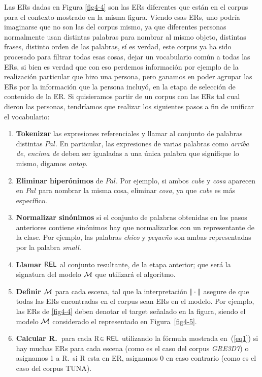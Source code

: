 Las ERs dadas en Figura \ref{fig4-4} son las ERs diferentes que est\'an en el corpus para el contexto mostrado en la misma figura. Viendo esas ERs, uno podr\'ia imaginarse que no son las del corpus mismo, ya que diferentes personas normalmente usan distintas palabras para nombrar al mismo objeto, distintas frases, distinto orden de las palabras, s\'i es verdad, este corpus ya ha sido procesado para filtrar todas esas cosas, dejar un vocabulario com\'un a todas las ERs, si bien es verdad que con eso perdemos informaci\'on por ejemplo de la realizaci\'on particular que hizo una persona, pero ganamos en poder agrupar las ERs por la informaci\'on que la persona incluy\'o, en la etapa de selecci\'on de contenido de la ER. Si quisieramos partir de un corpus con las ERs tal cual dieron las personas, tendr\'iamos que realizar los siguientes pasos a fin de unificar el vocabulario:

\begin{enumerate}
\item \textbf{Tokenizar} las expresiones referenciales y llamar al conjunto de palabras distintas
 $Pal$. En particular, las expresiones de varias palabras como {\it arriba de}, {\it encima de}
  deben ser igualadas a una \'unica palabra que signifique lo mismo, digamos \emph{ontop}.

\item \textbf{Eliminar hiper\'onimos} de $Pal$. Por ejemplo, si ambos \emph{cube} y
  \emph{cosa} aparecen en $Pal$ para nombrar la misma cosa, eliminar \emph{cosa}, ya que \emph{cube} es m\'as espec\'ifico.

\item \textbf{Normalizar sin\'onimos} si el conjunto de palabras obtenidas en los pasos anteriores contiene
  sin\'onimos hay que normalizarlos con un representante de la clase. Por ejemplo, las palabras \emph{chico}
  y \emph{peque\~no} son ambas representadas por la palabra \emph{small}.

\item \textbf{Llamar $\textsf{REL}$} al conjunto resultante, de la etapa anterior; que ser\'a la signatura del modelo $\mathcal{M}$ que utilizar\'a el algoritmo.

\item \textbf{Definir $\mathcal{M}$} para cada escena, tal que la interpretaci\'on
 $|\!|\cdot|\!|$ asegure de que todas las ERs encontradas en el corpus sean ERs en
  el modelo. Por ejemplo, las ERs de \ref{fig4-4} deben denotar el target se\~nalado en la figura, siendo el modelo 
$\mathcal{M}$ considerado el representado en Figura~\ref{fig4-5}.
\item \textbf{Calcular R.\puse\ }para cada R$\in \textsf{REL}$ utilizando la f\'ormula mostrada en~(\ref{eq1}) si
  hay muchas ERs para cada escena (como es el caso del corpus \textit{GRE3D7}) o asignamos 1 a R.\puse \ si R esta en ER, asignamos 0 en caso contrario (como es el caso del corpus TUNA).
\end{enumerate}

